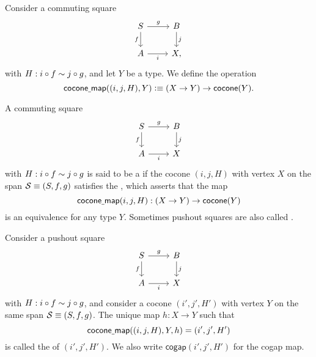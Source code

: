 \begin{defn}
Consider a commuting square
\begin{equation*}
\begin{tikzcd}
S \arrow[d,swap,"f"] \arrow[r,"g"] & B \arrow[d,"j"] \\
A \arrow[r,swap,"i"] & X,
\end{tikzcd}
\end{equation*}
with $H:i\circ f\sim j\circ g$, and let $Y$ be a type. We define the operation
\begin{equation*}
\mathsf{cocone\underline{\ }{}map}((i,j,H),Y) \vcentcolon\equiv (X\to Y) \to \mathsf{cocone}(Y).
\end{equation*}
\end{defn}

\begin{defn}
A commuting square
\begin{equation*}
\begin{tikzcd}
S \arrow[r,"g"] \arrow[d,swap,"f"] & B \arrow[d,"j"] \\
A \arrow[r,swap,"i"] & X
\end{tikzcd}
\end{equation*}
with $H:i\circ f \sim j\circ g$ is said to be a  if the cocone $(i,j,H)$ with vertex $X$ on the span $\mathcal{S}\equiv (S,f,g)$
satisfies the , which asserts that the map
\begin{equation*}
\mathsf{cocone\underline{\ }{}map}(i,j,H):(X\to Y)\to \mathsf{cocone}(Y)
\end{equation*}
is an equivalence for any type $Y$. Sometimes pushout squares are also called .
\end{defn}

\begin{defn}
Consider a pushout square
\begin{equation*}
\begin{tikzcd}
S \arrow[r,"g"] \arrow[d,swap,"f"] & B \arrow[d,"j"] \\
A \arrow[r,swap,"i"] & X
\end{tikzcd}
\end{equation*}
with $H:i\circ f \sim j\circ g$, and consider a cocone $(i',j',H')$ with vertex $Y$ on the same span $\mathcal{S}\equiv(S,f,g)$. The unique map $h:X\to Y$ such that 
\begin{equation*}
\mathsf{cocone\underline{\ }{}map}((i,j,H),Y,h)= (i',j',H')
\end{equation*}
is called the  of $(i',j',H')$. We also write $\mathsf{cogap}(i',j',H')$ for the cogap map. 
\end{defn}

